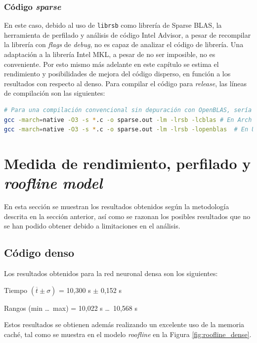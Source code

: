 \subsubsection{Código \textit{sparse}}
En este caso, debido al uso de \texttt{librsb} como librería de Sparse BLAS, la herramienta de perfilado y análisis de código Intel Advisor, a pesar de recompilar la librería con \textit{flags} de \textit{debug}, no es capaz de analizar el código de librería. Una adaptación a la librería Intel MKL, a pesar de no ser imposible, no es conveniente. Por esto mismo más adelante en este capítulo se estima el rendimiento y posibilidades de mejora del código disperso, en función a los resultados con respecto al denso. Para compilar el código para \textit{release}, las líneas de compilación son las siguientes:\medskip
\begin{lstlisting}[language=bash]
# Para una compilación convencional sin depuración con OpenBLAS, sería necesario únicamente ejecutar
gcc -march=native -O3 -s *.c -o sparse.out -lm -lrsb -lcblas # En Arch Linux
gcc -march=native -O3 -s *.c -o sparse.out -lm -lrsb -lopenblas  # En Ubuntu
\end{lstlisting}

\section{Medida de rendimiento, perfilado y \textit{roofline model}}
\label{sec:medida_perfilado_roofline}
En esta sección se muestran los resultados obtenidos según la metodología descrita en la sección anterior, así como se razonan los posibles resultados que no se han podido obtener debido a limitaciones en el análisis.

\subsection{Código denso}
Los resultados obtenidos para la red neuronal densa son los siguientes:

\begin{center}
Tiempo $(\overline{t} \pm \sigma)$ = 10,300 s $\pm$ 0,152 s

Rangos (min \ldots\ max) = 10,022 s \ldots\ 10,568 s
\end{center}

Estos resultados se obtienen además realizando un excelente uso de la memoria caché, tal como se muestra en el modelo \textit{roofline} en la Figura \ref{fig:roofline_dense}.

